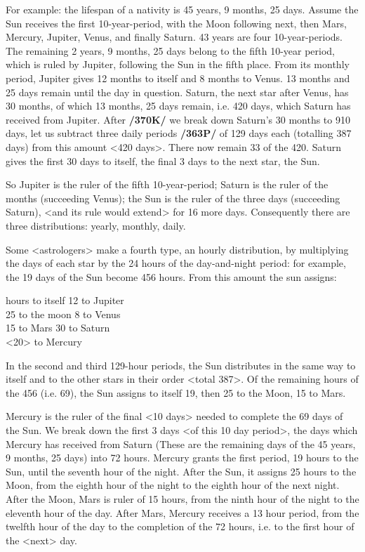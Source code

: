For example: the lifespan of a nativity is 45 years, 9 months, 25 days. Assume the Sun receives the first 10-year-period, with the Moon following next, then Mars, Mercury, Jupiter, Venus, and finally Saturn. 43 years are four 10-year-periods. The remaining 2 years, 9 months, 25 days belong to the fifth 10-year period, which is ruled by Jupiter, following the Sun in the fifth place. From its monthly period, Jupiter gives 12 months to itself and 8 months to Venus. 13 months and 25 days remain until the day in question. Saturn, the next star after Venus, has 30 months, of which 13 months, 25 days remain, i.e. 420 days, which Saturn has received from Jupiter. After \textbf{/370K/} we break down Saturn’s 30 months to 910 days, let us subtract three daily periods \textbf{/363P/} of 129 days each (totalling 387 days) from this amount <420 days>. There now remain 33 of the 420. Saturn gives the first 30 days to itself, the final 3 days to the next star, the Sun. 

So Jupiter is the ruler of the fifth 10-year-period; Saturn is the ruler of the months (succeeding Venus); the Sun is the ruler of the three days (succeeding Saturn), <and its rule would extend> for 16 more days. Consequently there are three distributions: yearly, monthly, daily. 

Some <astrologers> make a fourth type, an hourly distribution, by multiplying the days of each star by the 24 hours of the day-and-night period: for example, the 19 days of the Sun become 456 hours. From this amount the sun assigns:

 hours to itself 12 to Jupiter \\
25 to the moon 8 to Venus \\
15 to Mars 30 to Saturn \\
<20> to Mercury

In the second and third 129-hour periods, the Sun distributes in the same way to itself and to the other stars in their order <total 387>. Of the remaining hours of the 456 (i.e. 69), the Sun assigns to itself 19, then 25 to the Moon, 15 to Mars. 

Mercury is the ruler of the final <10 days> needed to complete the 69 days of the Sun. We break down the first 3 days <of this 10 day period>, the days which Mercury has received from Saturn (These are the remaining days of the 45 years, 9 months, 25 days) into 72 hours. Mercury grants the first period, 19 hours to the Sun, until the seventh hour of the night. After the Sun, it assigns 25 hours to the Moon, from the eighth hour of the night to the eighth hour of the next night. After the Moon, Mars is ruler of 15 hours, from the ninth hour of the night to the eleventh hour of the day. After Mars, Mercury receives a 13 hour period, from the twelfth hour of the day to the completion of the 72 hours, i.e. to the first hour of the <next> day.

